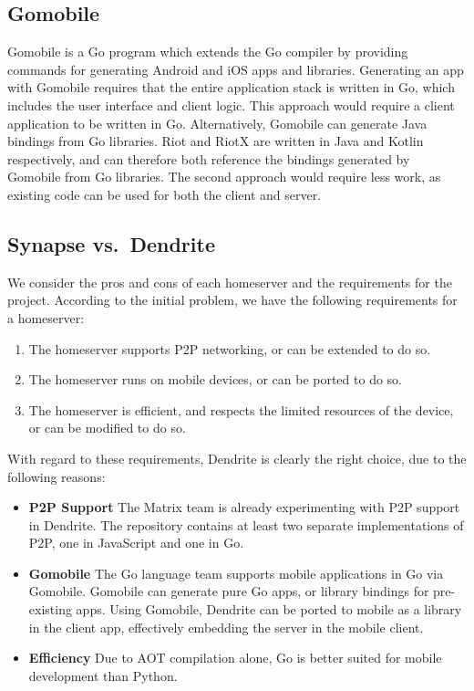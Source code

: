 \subsection{Gomobile}
Gomobile is a Go program which extends the Go compiler by providing commands for generating Android and iOS apps and libraries\cite{gomobile}.
Generating an app with Gomobile requires that the entire application stack is written in Go, which includes the user interface and client logic.
This approach would require a client application to be written in Go.
Alternatively, Gomobile can generate Java bindings from Go libraries.
Riot and RiotX are written in Java and Kotlin respectively, and can therefore both reference the bindings generated by Gomobile from Go libraries.
The second approach would require less work, as existing code can be used for both the client and server.

\subsection{Synapse vs.~Dendrite}\label{sec:synapse_vs_dendrite}
We consider the pros and cons of each homeserver and the requirements for the project.
According to the initial problem, we have the following requirements for a homeserver:
\begin{enumerate}
      \item{
            The homeserver supports \ac{P2P} networking, or can be extended to do so.
            }
      \item{
            The homeserver runs on mobile devices, or can be ported to do so.
            }
      \item{
            The homeserver is efficient, and respects the limited resources of the device, or can be modified to do so.
            }
\end{enumerate}
With regard to these requirements, Dendrite is clearly the right choice, due to the following reasons:
\begin{itemize}
      \item{
            \textbf{\ac{P2P} Support}
            The Matrix team is already experimenting with \ac{P2P} support in Dendrite.
            The repository contains at least two separate implementations of \ac{P2P}, one in JavaScript and one in Go\cite{fosdem_event_p2p_matrix}.
            }
      \item{
            \textbf{Gomobile}
            The Go language team supports mobile applications in Go via Gomobile\cite{gomobile}.
            Gomobile can generate pure Go apps, or library bindings for pre-existing apps.
            Using Gomobile, Dendrite can be ported to mobile as a library in the client app, effectively embedding the server in the mobile client.
            }
      \item{
            \textbf{Efficiency}
            Due to \ac{AOT} compilation alone, Go is better suited for mobile development than Python.
            }
\end{itemize}

